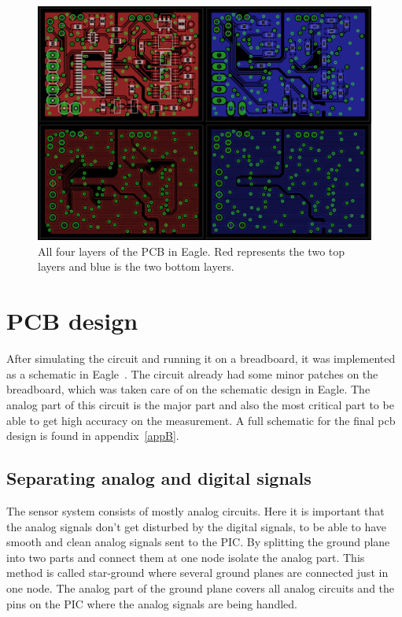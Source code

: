\begin{figure}
    \centering
    \includegraphics[width = \textwidth]{Figures/PCB4layer.png}
    \caption{All four layers of the PCB in Eagle. Red represents the two top layers and blue is the two bottom layers.}
    \label{fig:PCB4layer}
\end{figure}


\section{PCB design}

After simulating the circuit and running it on a breadboard, it was implemented as a schematic in Eagle~\cite{EAGLE}. The circuit already had some minor patches on the breadboard, which was taken care of on the schematic design in Eagle. The analog part of this circuit is the major part and also the most critical part to be able to get high accuracy on the measurement. A full schematic for the final \ac{pcb} design is found in appendix~\ref{appB}.

\subsection{Separating analog and digital signals}

The sensor system consists of mostly analog circuits. Here it is important that the analog signals don't get disturbed by the digital signals, to be able to have smooth and clean analog signals sent to the PIC. By splitting the ground plane into two parts and connect them at one node isolate the analog part. This method is called star-ground where several ground planes are connected just in one node. The analog part of the ground plane covers all analog circuits and the pins on the PIC where the analog signals are being handled.

